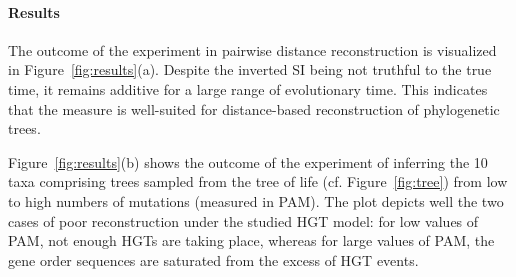 \documentclass[9pt,english,utf8]{article}
\begin{document}
\paragraph{Results} The outcome of the experiment in pairwise distance
reconstruction is visualized in Figure~\ref{fig:results}(a). Despite the
inverted SI being not truthful to the true time, it remains additive for a
large range of evolutionary time. This indicates that the measure is
well-suited for distance-based reconstruction of phylogenetic trees. 


Figure~\ref{fig:results}(b) shows the outcome of the experiment of inferring
the 10 taxa comprising trees sampled from the tree of life (cf.
Figure~\ref{fig:tree}) from low to high numbers of mutations (measured in PAM).
The plot depicts well the two cases of poor reconstruction under the studied
HGT model: for low values of PAM, not enough HGTs are taking place, whereas for
large values of PAM, the gene order sequences are saturated from the excess of
HGT events. 
\end{document}
